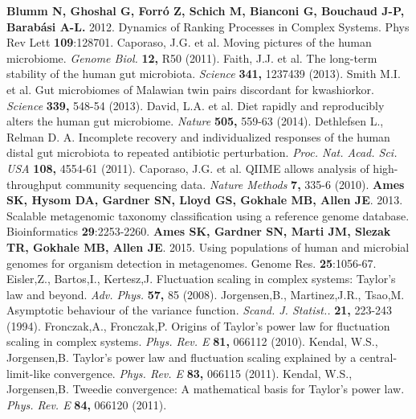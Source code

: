 \documentclass[12pt,oneside,letterpaper]{article}
\begin{document}
\begin{thebibliography}{99}
 {\bf Blumm N, Ghoshal G, Forró Z, Schich M, Bianconi G, Bouchaud J-P, Barabási A-L.} 2012. Dynamics of Ranking Processes in Complex Systems. Phys Rev Lett {\bf 109}:128701.
 Caporaso, J.G. et al. Moving pictures of the human microbiome. {\it Genome Biol.} {\bf 12,} R50 (2011).
 Faith, J.J. et al. The long-term stability of the human gut microbiota. {\it Science} {\bf 341,} 1237439 (2013).
 Smith M.I. et al. Gut microbiomes of Malawian twin pairs discordant for kwashiorkor. {\it Science} {\bf 339,} 548-54 (2013).
 David, L.A. et al. Diet rapidly and reproducibly alters the human gut microbiome. {\it Nature} {\bf 505,} 559-63 (2014).
 Dethlefsen L., Relman D. A. Incomplete recovery and individualized responses of the human distal gut microbiota to repeated antibiotic perturbation. {\it Proc. Nat. Acad. Sci. USA} {\bf 108,} 4554-61 (2011).
 Caporaso, J.G. et al. QIIME allows analysis of high-throughput community sequencing data. {\it Nature Methods} {\bf 7,} 335-6 (2010).
 {\bf Ames SK, Hysom DA, Gardner SN, Lloyd GS, Gokhale MB, Allen JE}.  2013. Scalable metagenomic taxonomy classification using a reference genome database.  Bioinformatics {\bf 29}:2253-2260.
 {\bf Ames SK, Gardner SN, Marti JM, Slezak TR, Gokhale MB, Allen JE}. 2015. Using populations of human and microbial genomes for organism detection in metagenomes. Genome Res. {\bf 25}:1056-67.
 Eisler,Z., Bartos,I., Kertesz,J. Fluctuation scaling in complex systems: Taylor's law and beyond. {\it Adv. Phys.} {\bf 57,} 85 (2008).
 Jorgensen,B., Martinez,J.R., Tsao,M. Asymptotic behaviour of the variance function. {\it Scand. J. Statist..} {\bf 21,} 223-243 (1994).
 Fronczak,A., Fronczak,P. Origins of Taylor's power law for fluctuation scaling in complex systems. {\it Phys. Rev. E} {\bf 81,} 066112 (2010).
 Kendal, W.S., Jorgensen,B. Taylor's power law and fluctuation scaling explained by a central-limit-like convergence. {\it Phys. Rev. E} {\bf 83,} 066115 (2011).
 Kendal, W.S., Jorgensen,B. Tweedie convergence: A mathematical basis for Taylor's power law. {\it Phys. Rev. E} {\bf 84,} 066120 (2011).


\end{thebibliography}
\end{document}
